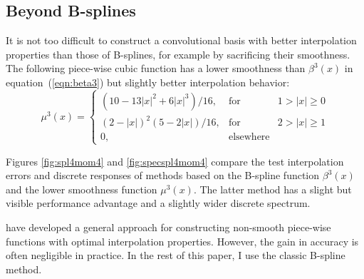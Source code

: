 


\subsection{Beyond B-splines}

It is not too difficult to construct a convolutional basis with better
interpolation properties than those of B-splines, for example by
sacrificing their smoothness. The following piece-wise cubic function
has a lower smoothness than $\beta^3(x)$ in equation~(\ref{eqn:beta3})
but slightly better interpolation behavior:
\begin{equation}
  \label{eqn:mu3}
  \mu^3(x) = \left\{\begin{array}{lcr}
\displaystyle \left(10-13 |x|^2+6 |x|^3\right)/16, & 
\mbox{for} & 1 > |x| \geq 0 \\
\displaystyle (2-|x|)^2 (5-2 |x|)/16, & \mbox{for} & 2 > |x| \geq 1 \\
0, & \mbox{elsewhere} &
\end{array}\right.
\end{equation}
\par
Figures \ref{fig:spl4mom4} and \ref{fig:specspl4mom4} compare the test
interpolation errors and discrete responses of methods based on the
B-spline function $\beta^3(x)$ and the lower smoothness function
$\mu^3(x)$. The latter method has a slight but visible performance
advantage and a slightly wider discrete spectrum.

\par
\cite{mom} have developed a general approach for constructing
non-smooth piece-wise functions with optimal interpolation properties.
However, the gain in accuracy is often negligible in practice. In the
rest of this paper, I use the classic B-spline method.

